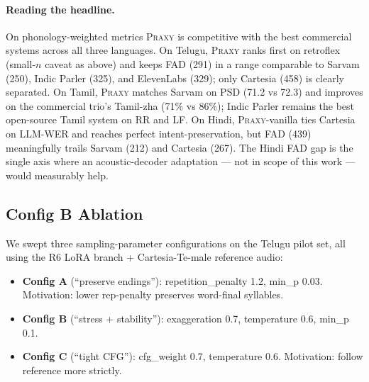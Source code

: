\documentclass[conference,a4paper]{IEEEtran}
\newcommand{\praxy}{\textsc{Praxy}}
\newcommand{\configb}{Config B}
\begin{document}
\paragraph{Reading the headline.} On phonology-weighted metrics \praxy{} is competitive with the best commercial systems across all three languages. On Telugu, \praxy{} ranks first on retroflex (small-$n$ caveat as above) and keeps FAD (291) in a range comparable to Sarvam (250), Indic Parler (325), and ElevenLabs (329); only Cartesia (458) is clearly separated. On Tamil, \praxy{} matches Sarvam on PSD (71.2 vs 72.3) and improves on the commercial trio's Tamil-zha (71\% vs 86\%); Indic Parler remains the best open-source Tamil system on RR and LF. On Hindi, \praxy{}-vanilla ties Cartesia on LLM-WER and reaches perfect intent-preservation, but FAD (439) meaningfully trails Sarvam (212) and Cartesia (267). The Hindi FAD gap is the single axis where an acoustic-decoder adaptation --- not in scope of this work --- would measurably help.

\subsection{\configb{} Ablation}
\label{sec:configb_ablation}

We swept three sampling-parameter configurations on the Telugu pilot set, all using the R6 LoRA branch + Cartesia-Te-male reference audio:

\begin{itemize}
  \item \textbf{Config A} (``preserve endings''): repetition\_penalty 1.2, min\_p 0.03. Motivation: lower rep-penalty preserves word-final syllables.
  \item \textbf{\configb} (``stress + stability''): exaggeration 0.7, temperature 0.6, min\_p 0.1.
  \item \textbf{Config C} (``tight CFG''): cfg\_weight 0.7, temperature 0.6. Motivation: follow reference more strictly.
\end{itemize}

\begin{table}[t]
\centering
\caption{\configb{} ablation on Telugu pilot set ($n=10$; \praxy{} R6 LoRA + Cartesia-Te-ref fixed across configs). \configb{} wins on all four measured axes.}
\label{tab:configb_ablation}
\small
{}
\end{table}
\end{document}
